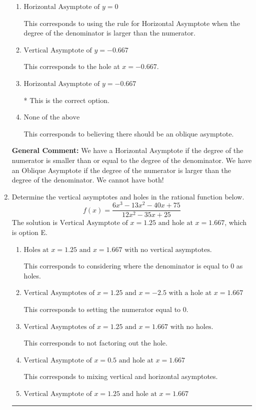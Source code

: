 \documentclass{extbook}[14pt]
\newcommand{\litem}[1]{\item #1

\rule{\textwidth}{0.4pt}}
\begin{document}
\begin{enumerate}
{\begin{enumerate}[label=\Alph*.]
This corresponds to the hole at $x = 1$.
\item \( \text{Horizontal Asymptote of } y = 0  \)

This corresponds to using the rule for Horizontal Asymptote when the degree of the denominator is larger than the numerator.
\item \( \text{Vertical Asymptote of } y = -0.667  \)

This corresponds to the hole at $x = -0.667$.
\item \( \text{Horizontal Asymptote of } y = -0.667  \)

* This is the correct option.
\item \( \text{None of the above} \)

This corresponds to believing there should be an oblique asymptote.
\end{enumerate}

\textbf{General Comment:} We have a Horizontal Asymptote if the degree of the numerator is smaller than or equal to the degree of the denominator. We have an Oblique Asymptote if the degree of the numerator is larger than the degree of the denominator. We cannot have both!
}
\litem{
Determine the vertical asymptotes and holes in the rational function below.
\[ f(x) = \frac{6x^{3} -13 x^{2} -40 x + 75}{12x^{2} -35 x + 25} \]The solution is \( \text{Vertical Asymptote of } x = 1.25 \text{ and hole at } x = 1.667 \), which is option E.\begin{enumerate}[label=\Alph*.]
\item \( \text{Holes at } x = 1.25 \text{ and } x = 1.667 \text{ with no vertical asymptotes.} \)

This corresponds to considering where the denominator is equal to 0 as holes.
\item \( \text{Vertical Asymptotes of } x = 1.25 \text{ and } x = -2.5 \text{ with a hole at } x = 1.667 \)

This corresponds to setting the numerator equal to 0.
\item \( \text{Vertical Asymptotes of } x = 1.25 \text{ and } x = 1.667 \text{ with no holes.} \)

This corresponds to not factoring out the hole.
\item \( \text{Vertical Asymptote of } x = 0.5 \text{ and hole at } x = 1.667 \)

This corresponds to mixing vertical and horizontal asymptotes.
\item \( \text{Vertical Asymptote of } x = 1.25 \text{ and hole at } x = 1.667 \)


\end{enumerate}}
\end{enumerate}
\end{document}

